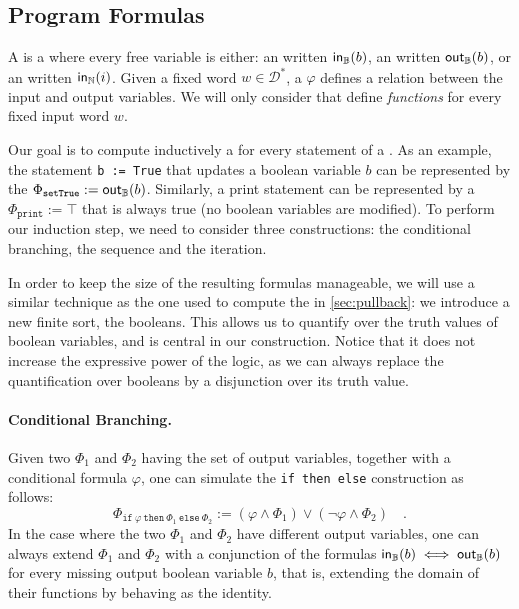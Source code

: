 \subsection{Program Formulas}
\label{sec:program-formulas}

\AP A  is a  where every free
variable is either: an   written $\mathsf{in}_{\mathbb{B}}(b)$,  an
 written $\mathsf{out}_{\mathbb{B}}(b)$, or an  written $\mathsf{in}_{\mathbb{N}}(i)$. Given a fixed word $w \in
\mathcal{D}^*$, a  $\varphi$ defines a relation between the
input and output variables. We will only consider  that
define \emph{functions} for every fixed input word $w$.

Our goal is to compute inductively a  for every statement
of a . As an example, the statement \texttt{b := True}
that updates a boolean variable $b$ can be represented by the  $\Phi_{\texttt{setTrue}} := \mathsf{out}_{\mathbb{B}}(b)$. Similarly, a print statement
can be represented by a  $\Phi_{\texttt{print}} := \top$
that is always true (no boolean variables are modified). To perform our
induction step, we need to consider three constructions: the conditional
branching, the sequence and the iteration.

In order to keep the size of the resulting formulas manageable, we will use a
similar technique as the one used to compute the  in
\cref{sec:pullback}: we introduce
a new finite sort, the booleans. This allows us to quantify over the truth
values of boolean variables, and is central in our construction. Notice that it
does not increase the expressive power of the logic, as we can always replace
the quantification over booleans by a disjunction over its truth value.

\paragraph{Conditional Branching.} 
Given two  $\Phi_1$ and $\Phi_2$ having 
the set of output variables,
together with a conditional formula $\varphi$, one can 
simulate the \texttt{if then else} construction 
as follows:
\begin{equation*}
    \Phi_{\texttt{if}~\varphi~\texttt{then}~\Phi_1~\texttt{else}~\Phi_2} := (\varphi \land \Phi_1) \lor (\neg \varphi \land \Phi_2) \quad .
\end{equation*}
In the case where the two  $\Phi_1$ and $\Phi_2$ have
different output variables, one can always extend $\Phi_1$ and $\Phi_2$ with
a conjunction of the
formulas $\mathsf{in}_{\mathbb{B}}(b) \iff \mathsf{out}_{\mathbb{B}}(b)$ for every missing output boolean variable $b$,
that is, extending the domain of their functions by behaving as the identity.


